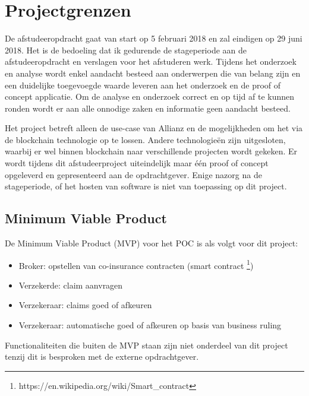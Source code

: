 \chapter{Projectgrenzen}
De afstudeeropdracht gaat van start op 5 februari 2018 en zal eindigen op 29 juni 2018. Het is de bedoeling dat ik gedurende de stageperiode aan de afstudeeropdracht en verslagen voor het afstuderen werk. Tijdens het onderzoek en analyse wordt enkel aandacht besteed aan onderwerpen die van belang zijn en een duidelijke toegevoegde waarde leveren aan het onderzoek en de proof of concept applicatie. Om de analyse en onderzoek correct en op tijd af te kunnen ronden wordt er aan alle onnodige zaken en informatie geen aandacht besteed.\par
Het project betreft alleen de use-case van Allianz en de mogelijkheden om het via de blockchain technologie op te lossen. Andere technologieën zijn uitgesloten, waarbij er wel binnen blockchain naar verschillende projecten wordt gekeken. Er wordt tijdens dit afstudeerproject uiteindelijk maar één proof of concept opgeleverd en gepresenteerd aan de opdrachtgever. Enige nazorg na de stageperiode, of het hosten van software is niet van toepassing op dit project.

\section{Minimum Viable Product}
De Minimum Viable Product (MVP) voor het POC is als volgt voor dit project:
\begin{itemize}
  \item Broker: opstellen van co-insurance contracten (smart contract \footnote{https://en.wikipedia.org/wiki/Smart\_contract})
  \item Verzekerde: claim aanvragen
  \item Verzekeraar: claims goed of afkeuren
  \item Verzekeraar: automatische goed of
afkeuren op basis van business ruling
\end{itemize}
Functionaliteiten die buiten de MVP staan zijn niet onderdeel van dit project tenzij dit is besproken met de externe opdrachtgever.
